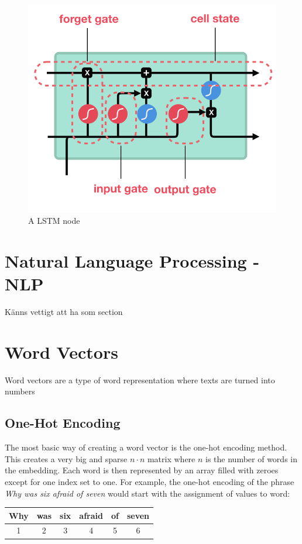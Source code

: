 \documentclass[nofilelist]{cslthse-msc}
\begin{document}
\begin{figure}[h!]
    \centering
    \includegraphics[scale=0.4]{msccls/explanatory_images/lstm.png}
    \caption{A LSTM node}
    \label{fig:lstm_node}
\end{figure}

\section{Natural Language Processing - NLP}
Känns vettigt att ha som section

\section{Word Vectors}
Word vectors are a type of word representation where texts are turned into numbers
\subsection{One-Hot Encoding}
The most basic way of creating a word vector is the one-hot encoding method. This creates a very big and sparse $n \cdot n$ matrix where $n$ is the number of words in the embedding. Each word is then represented by an array filled with zeroes except for one index set to one. For example, the one-hot encoding of the phrase \textit{Why was six afraid of seven} would start with the assignment of values to word:

\begin{center}
    \begin{tabular}{c|c|c|c|c|c}
    
         Why & was & six & afraid & of & seven \\
         \hline
         1 & 2 & 3 & 4 & 5 & 6 \\
    \end{tabular}
\end{center}
\end{document}
